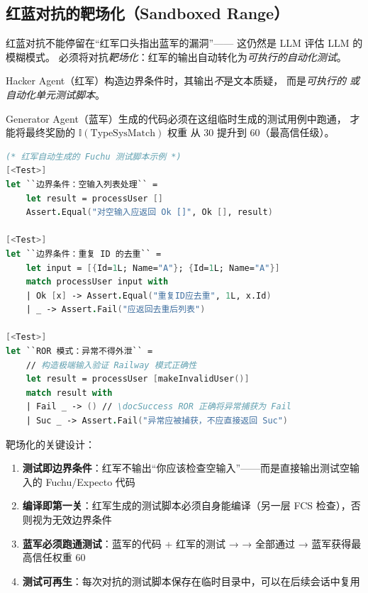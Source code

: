 \documentclass[10pt, openany]{book}
\begin{document}
\subsection{红蓝对抗的靶场化（Sandboxed Range）}

红蓝对抗不能停留在``红军口头指出蓝军的漏洞''——
这仍然是 LLM 评估 LLM 的模糊模式。
必须将对抗\emph{靶场化}：红军的输出自动转化为\emph{可执行的自动化测试}。

\begin{definition}[靶场化对抗]
    Hacker Agent（红军）构造边界条件时，其输出\emph{不}是文本质疑，
    而是\emph{可执行的  或  自动化单元测试脚本}。
    
    Generator Agent（蓝军）生成的代码必须在这组临时生成的测试用例中跑通，
    才能将最终奖励的 \(\mathbb{I}(\text{TypeSysMatch})\) 权重
    从 30 提升到 60（最高信任级）。
\end{definition}

\begin{lstlisting}[language=FSharp]
(* 红军自动生成的 Fuchu 测试脚本示例 *)
[<Test>]
let ``边界条件：空输入列表处理`` =
    let result = processUser []
    Assert.Equal("对空输入应返回 Ok []", Ok [], result)

[<Test>]  
let ``边界条件：重复 ID 的去重`` =
    let input = [{Id=1L; Name="A"}; {Id=1L; Name="A"}]
    match processUser input with
    | Ok [x] -> Assert.Equal("重复ID应去重", 1L, x.Id)
    | _ -> Assert.Fail("应返回去重后列表")

[<Test>]
let ``ROR 模式：异常不得外泄`` =
    // 构造极端输入验证 Railway 模式正确性
    let result = processUser [makeInvalidUser()]
    match result with
    | Fail _ -> () // \docSuccess ROR 正确将异常捕获为 Fail
    | Suc _ -> Assert.Fail("异常应被捕获，不应直接返回 Suc")
\end{lstlisting}

\noindent 靶场化的关键设计：

\begin{enumerate}
    \item \textbf{测试即边界条件}：红军不输出``你应该检查空输入''——而是直接输出测试空输入的 Fuchu/Expecto 代码
    \item \textbf{编译即第一关}：红军生成的测试脚本必须自身能编译（另一层 FCS 检查），否则视为无效边界条件
    \item \textbf{蓝军必须跑通测试}：蓝军的代码 + 红军的测试 →  → 全部通过 → 蓝军获得最高信任权重 60
    \item \textbf{测试可再生}：每次对抗的测试脚本保存在临时目录中，可以在后续会话中复用
\end{enumerate}
\end{document}
